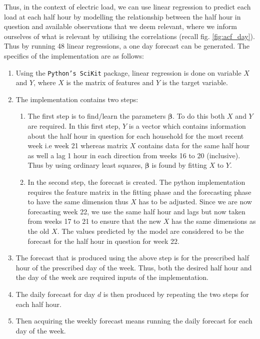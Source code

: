 Thus, in the context of electric load, we can use linear regression to predict each load at each half hour by modelling the relationship between the half hour in question and available observations that we deem relevant, where we inform ourselves of what is relevant by utilising the correlations (recall fig. \ref{fig:acf_day}). Thus by running 48 linear regressions, a one day forecast can be generated. The specifics of the implementation are as follows:
\begin{enumerate}
\item Using the \texttt{Python's SciKit} package, linear regression is done on variable $X$ and $Y$, where $X$ is the matrix of features and $Y$ is the target variable.
\item The implementation contains two steps: \begin{enumerate} \item The first step is to find/learn the parameters $\boldsymbol \beta$. To do this both $X$ and $Y$ are required. In this first step, $Y$ is a vector which contains information about the half hour in question for each household for the most recent week i.e week 21 whereas matrix $X$ contains data for the same half hour as well a lag 1 hour in each direction from weeks 16 to 20 (inclusive). Thus by using ordinary least squares, $\boldsymbol \beta$ is found by fitting $X$ to $Y$.
\item In the second step, the forecast is created. The python implementation requires the feature matrix in the fitting phase and the forecasting phase to have the same dimension thus $X$ has to be adjusted. Since we are now forecasting week 22, we use the same half hour and lags but now taken from weeks 17 to 21 to ensure that the new $X$ has the same dimensions as the old $X$. The values predicted by the model are considered to be the forecast for the half hour in question for week 22. \end{enumerate}
\item The forecast that is produced using the above step is for the prescribed half hour of the prescribed day of the week. Thus, both the desired half hour and the day of the week are required inputs of the implementation.
\item The daily forecast for day $d$ is then produced by repeating the two steps for each half hour.
\item Then acquiring the weekly forecast means running the daily forecast for each day of the week.
\end{enumerate}

